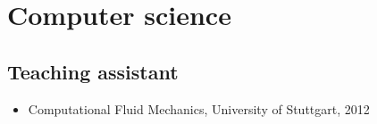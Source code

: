\documentclass[11pt,a4paper]{article}
\begin{document}
\section*{Computer science}

\subsection*{Teaching assistant}
\begin{itemize}
\item Computational Fluid Mechanics, University of Stuttgart, 2012
\end{itemize}

\label{LastPage}             
\end{document}

